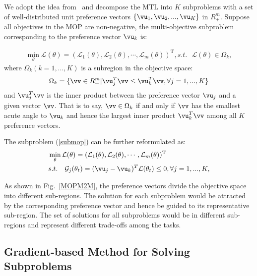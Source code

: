 We adopt the idea from~\cite{liu2014decomposition} and decompose the MTL into $K$ subproblems with a set of well-distributed unit preference vectors $\{\vu_1,\vu_2,...,\vu_K\}$ in $R^m_{+}$. Suppose all objectives in the MOP are non-negative, the multi-objective subproblem corresponding to the preference vector $\vu_k$ is:

\begin{eqnarray}
    \label{submop}
       \min_{\theta}  \mathcal{L}(\theta) = (\mathcal{L}_1(\theta),\mathcal{L}_2(\theta),\cdots,
\mathcal{L}_m(\theta))^{\mathrm{T}},   s.t.~~~ \mathcal{L}(\theta) \in \Omega_k,
\end{eqnarray}
where $\Omega_k (k = 1,...,K)$ is a subregion in the objective space:
\begin{eqnarray}
    \label{subregion}
	\Omega_k = \{\vv \in R^m_{+}| \vu_j^T\vv \leq \vu_k^T\vv, \forall j = 1,...,K  \}
\end{eqnarray}
and $\vu_j^T\vv$ is the inner product between the preference vector $\vu_j$ and a given vector $\vv$. That is to say, $\vv \in \Omega_k$  if and only if $\vv$ has the smallest acute angle to $\vu_k$ and hence the largest inner product $\vu_k^T\vv$ among all $K$ preference vectors.

The subproblem (\ref{submop}) can be further reformulated as:
\begin{eqnarray}
    \label{submop_v1}
    \begin{aligned}
        & \min_{\theta} \mathcal{L}(\theta) = (\mathcal{L}_1(\theta),\mathcal{L}_2(\theta),\cdots,
\mathcal{L}_m(\theta))^{\mathrm{T}}\\
        &s.t.~~~ \mathcal{G}_j(\theta_t) = (  \vu_j -\vu_k)^T \mathcal{L}(\theta_t) \leq 0, \forall j = 1,...,K, \\
    \end{aligned}
\end{eqnarray}

As shown in Fig.~\ref{MOPM2M}, the preference vectors divide the objective space into different sub-regions. The solution for each subproblem would be attracted by the corresponding preference vector and hence be guided to its representative sub-region. The set of solutions for all subproblems would be in different sub-regions and represent different trade-offs among the tasks.

\subsection{Gradient-based Method for Solving Subproblems}

